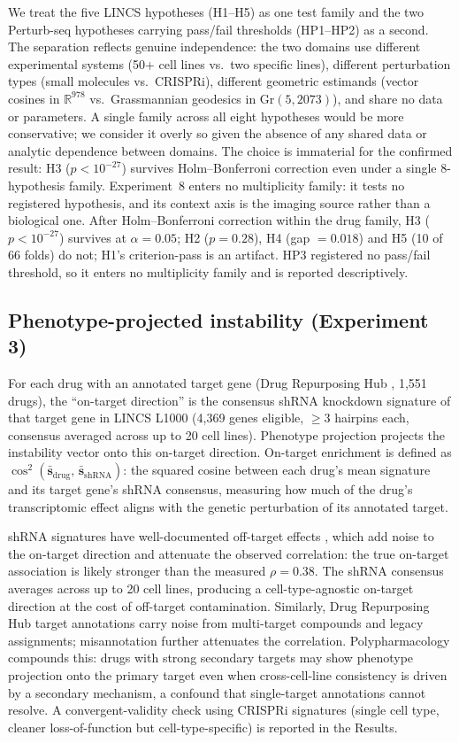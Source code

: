\documentclass[11pt]{article}
\begin{document}
We treat the five LINCS hypotheses (H1--H5) as one test family and the two
Perturb-seq hypotheses carrying pass/fail thresholds (HP1--HP2) as a second. The separation
reflects genuine independence: the two domains use different experimental
systems (50+ cell lines vs.\ two specific lines), different perturbation types
(small molecules vs.\ CRISPRi), different geometric estimands (vector
cosines in $\mathbb{R}^{978}$ vs.\ Grassmannian geodesics in Gr$(5, 2073)$),
and share no data or parameters. A single family across all eight hypotheses
would be more conservative; we consider it overly so given the absence of
any shared data or analytic dependence between domains. The choice is
immaterial for the confirmed result: H3 ($p < 10^{-27}$) survives
Holm--Bonferroni correction even under a single 8-hypothesis family. Experiment~8
enters no multiplicity family: it tests no registered hypothesis, and its
context axis is the imaging source rather than a biological one. After Holm--Bonferroni
correction within the drug family, H3 ($p < 10^{-27}$) survives at
$\alpha = 0.05$; H2 ($p = 0.28$), H4 (gap $= 0.018$) and H5 (10 of 66
folds) do not;
H1's criterion-pass is an artifact.
HP3 registered no pass/fail threshold, so it enters no multiplicity
family and is reported descriptively.

\subsection{Phenotype-projected instability (Experiment 3)}

For each drug with an annotated target gene (Drug Repurposing Hub
\citep{corsello2017drug}, 1{,}551 drugs), the ``on-target direction'' is the consensus shRNA
knockdown signature of that target gene in LINCS L1000 (4{,}369 genes
eligible, $\geq$3 hairpins each, consensus averaged across up to 20 cell lines).
Phenotype projection projects the instability vector onto this
on-target direction. On-target enrichment is defined as $\cos^2(\bar{\mathbf{s}}_{\text{drug}},\,
\bar{\mathbf{s}}_{\text{shRNA}})$: the squared cosine between each drug's
mean signature and its target gene's shRNA consensus, measuring how much
of the drug's transcriptomic effect aligns with the genetic perturbation of
its annotated target.

shRNA signatures have well-documented off-target effects
\citep{smith2017evaluation}, which add noise to the on-target direction
and attenuate the observed correlation: the true on-target association is
likely stronger than the measured $\rho = 0.38$.
The shRNA consensus averages across up to 20 cell lines, producing a
cell-type-agnostic on-target direction at the cost of off-target
contamination. Similarly, Drug Repurposing Hub target annotations carry
noise from multi-target compounds and legacy assignments; misannotation
further attenuates the correlation. Polypharmacology compounds this:
drugs with strong secondary targets may show phenotype projection onto the
primary target even when cross-cell-line consistency is driven by a
secondary mechanism, a confound that single-target annotations cannot
resolve. A convergent-validity
check using CRISPRi signatures (single cell type, cleaner
loss-of-function but cell-type-specific) is reported in the Results.
\end{document}
